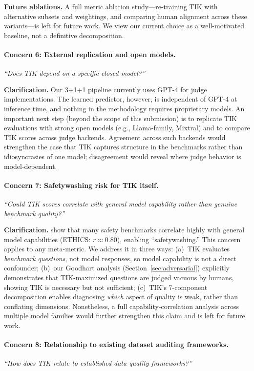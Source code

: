\documentclass[11pt]{article}
\begin{document}
\textbf{Future ablations.} A full metric ablation study—re-training TIK with alternative subsets and weightings, and comparing human alignment across these variants—is left for future work. We view our current choice as a well-motivated baseline, not a definitive decomposition.

\paragraph{Concern 6: External replication and open models.}
\emph{“Does TIK depend on a specific closed model?”}

\textbf{Clarification.} Our 3+1+1 pipeline currently uses GPT-4 for judge implementations. The learned predictor, however, is independent of GPT-4 at inference time, and nothing in the methodology requires proprietary models. An important next step (beyond the scope of this submission) is to replicate TIK evaluations with strong open models (e.g., Llama-family, Mixtral) and to compare TIK scores across judge backends. Agreement across such backends would strengthen the case that TIK captures structure in the benchmarks rather than idiosyncrasies of one model; disagreement would reveal where judge behavior is model-dependent.

\paragraph{Concern 7: Safetywashing risk for TIK itself.}
\emph{``Could TIK scores correlate with general model capability rather than genuine benchmark quality?''}

\textbf{Clarification.} \citet{ren2024safetywashing} show that many safety benchmarks correlate highly with general model capabilities (ETHICS: $r \approx 0.80$), enabling ``safetywashing.'' This concern applies to any meta-metric. We address it in three ways: (a)~TIK evaluates \textit{benchmark questions}, not model responses, so model capability is not a direct confounder; (b)~our Goodhart analysis (Section~\ref{sec:adversarial}) explicitly demonstrates that TIK-maximized questions are judged vacuous by humans, showing TIK is necessary but not sufficient; (c)~TIK's 7-component decomposition enables diagnosing \textit{which} aspect of quality is weak, rather than conflating dimensions. Nonetheless, a full capability-correlation analysis across multiple model families would further strengthen this claim and is left for future work.

\paragraph{Concern 8: Relationship to existing dataset auditing frameworks.}
\emph{``How does TIK relate to established data quality frameworks?''}
\end{document}
